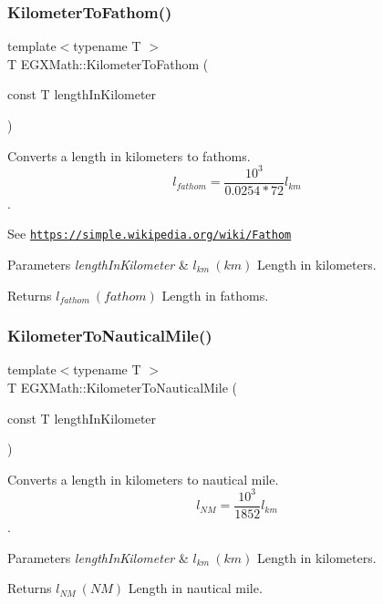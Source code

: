 \subsubsection{\texorpdfstring{Kilometer\+To\+Fathom()}{KilometerToFathom()}}
{\footnotesize\ttfamily template$<$typename T $>$ \\
T E\+G\+X\+Math\+::\+Kilometer\+To\+Fathom (\begin{DoxyParamCaption}\item[{const T}]{length\+In\+Kilometer }\end{DoxyParamCaption})}



Converts a length in kilometers to fathoms. \[ l_{fathom}= \frac{10^{3}}{0.0254 * 72} l_{km} \]. 

See \href{https://simple.wikipedia.org/wiki/Fathom}{\tt https\+://simple.\+wikipedia.\+org/wiki/\+Fathom} 
\begin{DoxyParams}{Parameters}
{\em length\+In\+Kilometer} & $ l_{km}\ (km)$ Length in kilometers. \\
\hline
\end{DoxyParams}
\begin{DoxyReturn}{Returns}
$ l_{fathom}\ (fathom)$ Length in fathoms. 
\end{DoxyReturn}
\mbox{\label{group___e_g_x_math-_conversions-_length_conversions-_s_i-_kilometer-_nautical_ga4571f464f551ae965f88192b53dd24ff}} 
\subsubsection{\texorpdfstring{Kilometer\+To\+Nautical\+Mile()}{KilometerToNauticalMile()}}
{\footnotesize\ttfamily template$<$typename T $>$ \\
T E\+G\+X\+Math\+::\+Kilometer\+To\+Nautical\+Mile (\begin{DoxyParamCaption}\item[{const T}]{length\+In\+Kilometer }\end{DoxyParamCaption})}



Converts a length in kilometers to nautical mile. \[ l_{NM}= \frac{10^{3}}{1852} l_{km} \]. 


\begin{DoxyParams}{Parameters}
{\em length\+In\+Kilometer} & $ l_{km}\ (km)$ Length in kilometers. \\
\hline
\end{DoxyParams}
\begin{DoxyReturn}{Returns}
$ l_{NM}\ (NM)$ Length in nautical mile. 
\end{DoxyReturn}
